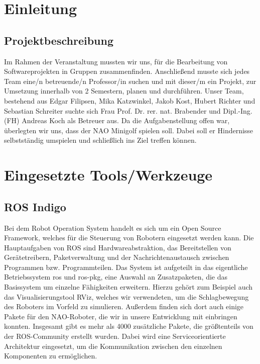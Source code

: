 \documentclass{scrartcl}
\begin{document}
\newpage
\tableofcontents
\newpage

\section{Einleitung}


\subsection{Projektbeschreibung}

Im Rahmen der Veranstaltung mussten wir uns, für die Bearbeitung von Softwareprojekten in Gruppen zusammenfinden. Anschließend musste sich jedes Team eine/n betreuende/n Professor/in suchen und mit dieser/m ein Projekt, zur Umsetzung innerhalb von 2 Semestern, planen und durchführen. Unser Team, bestehend aus Edgar Filipsen, Mika Katzwinkel, Jakob Kost, Hubert Richter und Sebastian Schreiter suchte sich Frau Prof. Dr. rer. nat. Brabender und Dipl.-Ing. (FH) Andreas Koch als Betreuer aus.
Da die Aufgabenstellung offen war, überlegten wir uns, dass der NAO Minigolf spielen soll. Dabei soll er Hindernisse selbstständig umspielen und schließlich ins Ziel treffen können.

\section{Eingesetzte Tools/Werkzeuge}

\subsection{ROS Indigo}
Bei dem Robot Operation System handelt es sich um ein Open Source Framework, welches für die Steuerung von Robotern eingesetzt werden kann. Die Hauptaufgaben von ROS sind Hardwareabstraktion, das Bereitstellen von Gerätetreibern, Paketverwaltung und der Nachrichtenaustausch zwischen Programmen bzw. Programmteilen. Das System ist aufgeteilt in das eigentliche Betriebssystem ros und ros-pkg, eine Auswahl an Zusatzpaketen, die das Basissystem um einzelne Fähigkeiten erweitern. Hierzu gehört zum Beispiel auch das Visualisierungstool RViz, welches wir verwendeten, um die Schlagbewegung des Roboters im Vorfeld zu simulieren. Außerdem finden sich dort auch einige Pakete für den NAO-Roboter, die wir in unsere Entwicklung mit einbringen konnten. Insgesamt gibt es mehr als 4000 zusätzliche Pakete, die größtenteils von der ROS-Community erstellt wurden. Dabei wird eine Serviceorientierte Architektur eingesetzt, um die Kommunikation zwischen den einzelnen Komponenten zu ermöglichen.
\end{document}
